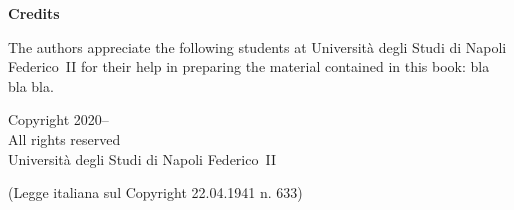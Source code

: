 \thispagestyle{empty}
\noindent
{\Large\textbf{Credits}}
\bigskip

\noindent
\begin{minipage}{\textwidth}
The authors appreciate the following students at Università degli Studi di Napoli Federico~II for their help in preparing the material contained in this book: bla bla bla.
\end{minipage}
\vspace*{\fill}
{



\bigskip

\centering Copyright 2020--\the\year\ \myAuthorName\\
All rights reserved\\
Università degli Studi di Napoli Federico~II

\medskip
\hfil (Legge italiana sul Copyright 22.04.1941 n. 633)
}%